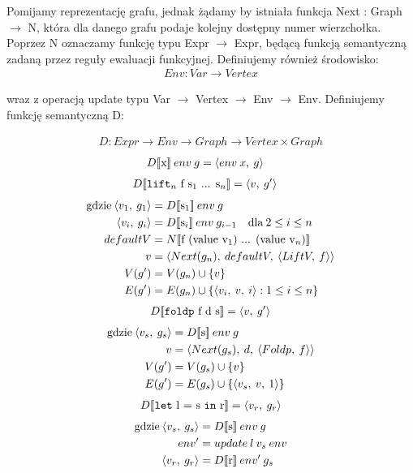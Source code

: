 \documentclass[11pt,leqno]{article}
\newcommand{\denote}[1]{\text{$[\![ $#1$ ]\!]$}}
\begin{document}
Pomijamy reprezentację grafu, jednak żądamy by istniała funkcja Next : Graph $\rightarrow$ N, która dla danego grafu podaje kolejny dostępny numer wierzchołka. Poprzez N oznaczamy funkcję typu Expr $\rightarrow$ Expr, będącą funkcją semantyczną zadaną przez reguły ewaluacji funkcyjnej. Definiujemy również środowisko:
\begin{gather*}
Env : Var \rightarrow Vertex  
\end{gather*}

wraz z operacją update typu Var $\rightarrow$ Vertex $\rightarrow$ Env $\rightarrow$ Env. Definiujemy funkcję semantyczną D:

\begin {align*}
D : Expr \rightarrow Env \rightarrow Graph \rightarrow Vertex \times Graph
\end {align*}
\begin {align*}
D\denote{x}\:env\:g &= \langle env\:x,\:g \rangle
\end {align*}
\begin {align*}
D\denote{\texttt{lift$_{n}$} f s$_{1}$ ... s$_{n}$} &= \langle v,\:g' \rangle
\end {align*}
\begin {align*}
\text{gdzie} \: \langle v_{1},\:g_{1} \rangle &= D\denote{s$_{1}$}\:env\:g \\
\langle v_{i},\:g_{i} \rangle &= D\denote{s$_{i}$}\:env\:g_{i-1} \quad \text{dla}\:2 \leq i \leq n \\
defaultV &= N\denote{f (value v$_{1}$) ... (value v$_{n}$)} \\
v &= \langle Next(g_{n}),\:defaultV,\:\langle LiftV,\:f \rangle \rangle \\
V(g') &= V(g_{n}) \cup \left\{ {v}\right\} \\
E(g') &= E(g_{n}) \cup \{\langle v_{i},\:v,\:i \rangle : 1 \leq i \leq n\}
\end {align*}
\begin {align*}
D\denote{\texttt{foldp} f d s} = \langle v,\:g' \rangle
\end {align*}
\begin {align*}
\text{gdzie} \: \langle v_{s},\:g_{s} \rangle &= D\denote{s}\:env\:g \\
v &= \langle Next(g_{s}),\:d,\:\langle Foldp,\:f \rangle \rangle \\
V(g') &= V(g_{s}) \cup \left\{ {v}\right\} \\
E(g') &= E(g_{s}) \cup \{\langle v_{s},\:v,\:1 \rangle \}
\end {align*}
\begin {align*}
D\denote{\texttt{let} l = s \texttt{in} r} = \langle v_{r},\:g_{r} \rangle
\end {align*}
\begin {align*}
\text{gdzie} \: \langle v_{s},\:g_{s} \rangle &= D\denote{s}\:env\:g \\
env' &= update\:l\:v_{s}\:env \\
\langle v_{r},\:g_{r} \rangle &= D\denote{r}\:env'\:g_{s}
\end{align*}
\end{document}
